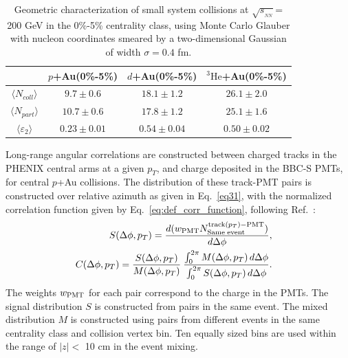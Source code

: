 \documentclass[%
reprint,
showpacs,preprintnumbers,
 amsmath,amssymb,
 aps,
]{revtex4-1}
\newcommand{\pt}{\mbox{$p_T$}\xspace}
\newcommand{\sqsn}{\mbox{$\sqrt{s_{_{NN}}}$}\xspace}
\newcommand{\dau}{\mbox{$d$+Au}\xspace}
\newcommand{\pau}{\mbox{$p$+Au}\xspace}
\newcommand{\hau}{\mbox{$^3\text{He}$+Au}\xspace}
\begin{document}
\begin{table}
\caption{Geometric characterization of small system collisions at \sqsn = 200 GeV in the 0\%-5\% centrality class, using Monte Carlo Glauber with nucleon coordinates smeared by a two-dimensional Gaussian of width $\sigma=0.4$ fm.}
\begin{ruledtabular}
\begin{tabular}{c c c c}
\label{table_geometry}
 & \pau (0\%-5\%) & \dau (0\%-5\%) & \hau (0\%-5\%) \\
\hline
 $\langle N_{coll} \rangle$ & $9.7\pm 0.6$ & $18.1\pm 1.2$ & $26.1\pm 2.0$ \\
 $\langle N_{part} \rangle$ & $10.7\pm 0.6$ & $17.8\pm 1.2$ & $25.1\pm  1.6$ \\ 
 $\langle \varepsilon_2 \rangle$ & $0.23\pm 0.01$ & $0.54\pm 0.04$ & $0.50\pm 0.02$
\end{tabular}
\end{ruledtabular}
\end{table}
Long-range angular correlations are constructed between charged tracks in the PHENIX central arms at a given \pt, and charge deposited in the BBC-S PMTs, for central \pau collisions. The distribution of these track-PMT pairs is constructed over relative azimuth as given in Eq.~\ref{eq31}, with the normalized correlation function given by Eq.~\ref{eq:def_corr_function}, following Ref.~\cite{PhysRevLett.115.142301}:
\begin{eqnarray}
  S(\Delta\phi,p_{T})=
  \frac{ d(w_{{\rm PMT}} N^{{\rm track}(p_{T}){\rm - PMT}}_{{\rm Same \; event}}) }{ d\Delta\phi}, & &
\label{eq31} \\
  C(\Delta\phi,p_{T}) =
          \frac{S(\Delta\phi,p_{T})}{M(\Delta\phi,p_{T})} \:
          \frac{\int_{0}^{2\pi} M(\Delta\phi,p_{T}) \, d\Delta\phi}{\int_{0}^{2\pi} S(\Delta\phi,p_{T}) \, d\Delta\phi}. & &
  \label{eq:def_corr_function}
\end{eqnarray}
The weights $w_{{\rm PMT}}$ for each pair correspond to the charge in the PMTs. The signal distribution $S$ is constructed from pairs in the same event. The mixed distribution $M$ is constructed using pairs from different events in the same centrality class and collision vertex bin. Ten equally sized bins are used within the range of $|z|<$ 10 cm in the event mixing.
\end{document}

